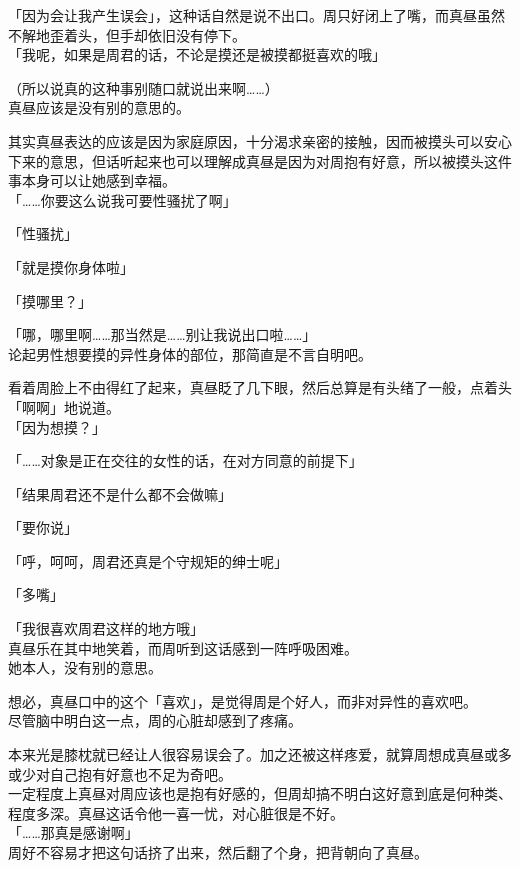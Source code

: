 「因为会让我产生误会」，这种话自然是说不出口。周只好闭上了嘴，而真昼虽然不解地歪着头，但手却依旧没有停下。\\

「我呢，如果是周君的话，不论是摸还是被摸都挺喜欢的哦」

（所以说真的这种事别随口就说出来啊……）\\

真昼应该是没有别的意思的。

其实真昼表达的应该是因为家庭原因，十分渴求亲密的接触，因而被摸头可以安心下来的意思，但话听起来也可以理解成真昼是因为对周抱有好意，所以被摸头这件事本身可以让她感到幸福。\\

「……你要这么说我可要性骚扰了啊」

「性骚扰」

「就是摸你身体啦」

「摸哪里？」

「哪，哪里啊……那当然是……别让我说出口啦……」\\

论起男性想要摸的异性身体的部位，那简直是不言自明吧。

看着周脸上不由得红了起来，真昼眨了几下眼，然后总算是有头绪了一般，点着头「啊啊」地说道。\\

「因为想摸？」

「……对象是正在交往的女性的话，在对方同意的前提下」

「结果周君还不是什么都不会做嘛」

「要你说」

「呼，呵呵，周君还真是个守规矩的绅士呢」

「多嘴」

「我很喜欢周君这样的地方哦」\\

真昼乐在其中地笑着，而周听到这话感到一阵呼吸困难。\\

她本人，没有别的意思。

想必，真昼口中的这个「喜欢」，是觉得周是个好人，而非对异性的喜欢吧。\\

尽管脑中明白这一点，周的心脏却感到了疼痛。

本来光是膝枕就已经让人很容易误会了。加之还被这样疼爱，就算周想成真昼或多或少对自己抱有好意也不足为奇吧。\\

一定程度上真昼对周应该也是抱有好感的，但周却搞不明白这好意到底是何种类、程度多深。真昼这话令他一喜一忧，对心脏很是不好。\\

「……那真是感谢啊」\\

周好不容易才把这句话挤了出来，然后翻了个身，把背朝向了真昼。
